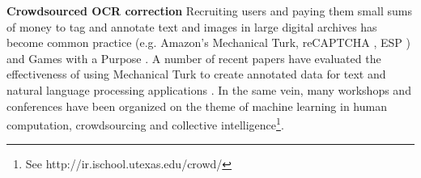 \documentclass[letterpaper]{article}
\begin{document}

\noindent \textbf{Crowdsourced OCR correction }Recruiting users and paying them small sums of money to tag and annotate text and images in large digital archives has become common practice (e.g. Amazon's Mechanical Turk, reCAPTCHA \cite{vonAhn_08}, ESP \cite{vonAhn_04}) and Games with a Purpose \cite{Ahn_08w}. A number of recent papers have evaluated the effectiveness of using Mechanical Turk to create annotated data for text and natural language processing applications \cite{Snow_08}. In the same vein, many workshops and conferences have been organized on the theme of machine learning in human computation, crowdsourcing and collective intelligence\footnote{See http://ir.ischool.utexas.edu/crowd/}. 
\end{document}

